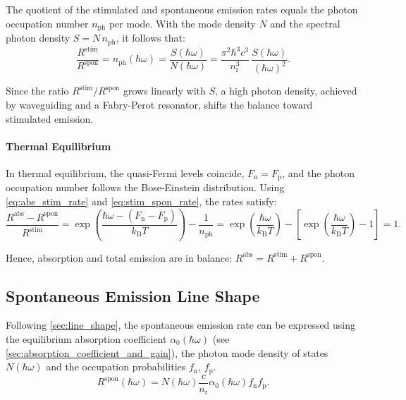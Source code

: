 The quotient of the stimulated and spontaneous emission rates equals the photon
occupation number $n_{\mathrm{ph}}$ per mode. With the mode density $N$ and the spectral
photon density $S=N\,n_{\mathrm{ph}}$, it follows that:
\begin{equation}
	\frac{R^{\mathrm{stim}}}{R^{\mathrm{spon}}}=n_{\mathrm{ph}}(\hbar \omega)=\frac{S(\hbar\omega)}{N(\hbar\omega)}
	=\frac{\pi^{2}\hbar^{3}c^{3}}{n_{\mathrm{r}}^{3}}\,\frac{S(\hbar\omega)}{(\hbar\omega)^{2}}.
	\label{eq:stim_spon_rate}
\end{equation}

Since the ratio $R^{\mathrm{stim}}/R^{\mathrm{spon}}$ grows linearly with $S$, a high
photon density, achieved by waveguiding and a Fabry-Perot resonator, shifts the balance
toward stimulated emission.

\paragraph{Thermal Equilibrium}

In thermal equilibrium, the quasi-Fermi levels coincide,
$F_{\mathrm{n}}=F_{\mathrm{p}}$, and the photon occupation number follows the Bose-Einstein
distribution. Using \cref{eq:abs_stim_rate} and \cref{eq:stim_spon_rate}, the rates
satisfy:
\begin{equation}
	\frac{R^{\mathrm{abs}}-R^{\mathrm{spon}}}{R^{\mathrm{stim}}}=\exp\left( \frac{\hbar \omega- (F_{\mathrm{n}}-F_{\mathrm{p}})}{k_{\mathrm{B}}T}\right) - \frac{1}{n_{\mathrm{ph}}}=\exp\left( \frac{\hbar \omega}{k_{\mathrm{B}}T}\right) - \left[\exp\left( \frac{\hbar \omega}{k_{\mathrm{B}}T}\right) - 1\right]=1.
\end{equation}

Hence, absorption and total emission are in balance:
$R^{\mathrm{abs}}=R^{\mathrm{stim}}+R^{\mathrm{spon}}$.

\subsection{Spontaneous Emission Line Shape}
\label{sec:spontaneous_emission}

Following \cref{sec:line_shape}, the spontaneous emission rate can be expressed
using the equilibrium absorption coefficient $\alpha_{0}(\hbar\omega)$ (see \cref{sec:absorption_coefficient_and_gain}),
the photon mode density of states $N(\hbar \omega)$ and the occupation probabilities $f
_{\mathrm{n}}$, $f_{\mathrm{p}}$.
\begin{equation}
	R^{\mathrm{spon}}(\hbar \omega)=N(\hbar\omega) \frac{c}{n_{\mathrm{r}}}\alpha_{0}
	(\hbar \omega) f_{\mathrm{n}}f_{\mathrm{p}}.
\end{equation}

